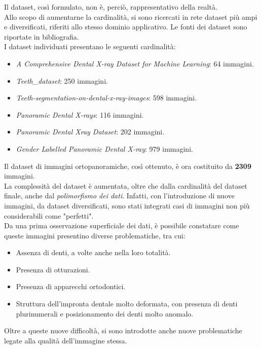 \documentclass[12pt,a4paper,openright,twoside]{book}
\begin{document}
Il dataset, così formulato, non è, perciò, rappresentativo della realtà.\\

Allo scopo di aumentarne la cardinalità, si sono ricercati in rete dataset più ampi e diversificati, riferiti allo stesso dominio applicativo. Le fonti dei dataset sono riportate in bibliografia.\\
I dataset individuati presentano le seguenti cardinalità:
\begin{itemize}
\item {\itshape A Comprehensive Dental X-ray Dataset for Machine Learning}: 64 immagini.
\item {\itshape Teeth\_dataset}: 250 immagini.
\item {\itshape Teeth-segmentation-on-dental-x-ray-images}: 598 immagini.
\item {\itshape Panoramic Dental X-rays}: 116  immagini.
\item {\itshape Panoramic Dental Xray Dataset}: 202 immagini.
\item {\itshape Gender Labelled Panoramic Dental X‑ray}: 979 immagini.
\end{itemize}

Il dataset di immagini ortopanoramiche, così ottenuto, è ora costituito da \textbf{2309} immagini.\\
La complessità del dataset è aumentata, oltre che dalla cardinalità del dataset finale, anche dal {\itshape polimorfismo dei dati}. Infatti, con l'introduzione di nuove immagini, da dataset diversificati, sono stati integrati casi di immagini non più considerabili come "perfetti".\\
Da una prima osservazione superficiale dei dati, è possibile constatare come queste immagini presentino diverse problematiche, tra cui:
\begin{itemize}
\item Assenza di denti, a volte anche nella loro totalità.
\item Presenza di otturazioni.
\item Presenza di apparecchi ortodontici.
\item Struttura dell'impronta dentale molto deformata, con presenza di denti plurinumerali e posizionamento dei denti molto anomalo.
\end{itemize}

Oltre a queste nuove difficoltà, si sono introdotte anche nuove problematiche legate alla qualità dell'immagine stessa.\\
\end{document}
